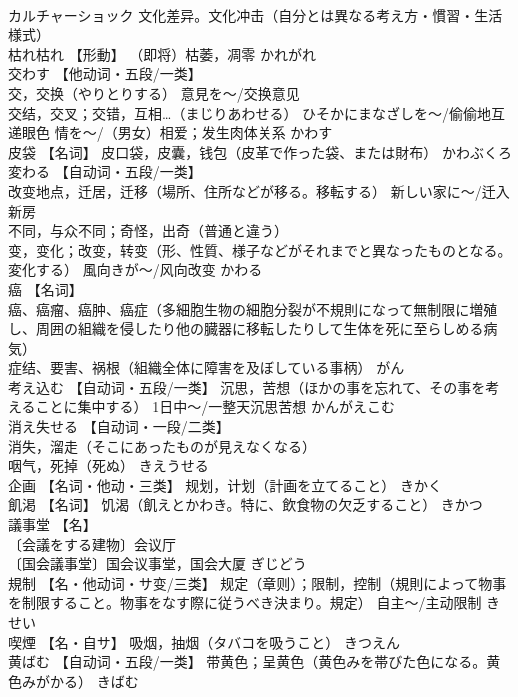 \documentclass[8pt]{extreport}
\begin{document}
\begin{CJK}{UTF8}{min}
\\	カルチャーショック	文化差异。文化冲击（自分とは異なる考え方・慣習・生活様式）		
\\	枯れ枯れ	【形動】 （即将）枯萎，凋零	かれがれ	
\\	交わす	【他动词・五段/一类】 
\\	交，交换（やりとりする） 意見を～/交换意见 
\\	交结，交叉；交错，互相…（まじりあわせる） ひそかにまなざしを～/偷偷地互递眼色 情を～/（男女）相爱；发生肉体关系	かわす	
\\	皮袋	【名词】 皮口袋，皮囊，钱包（皮革で作った袋、または財布）	かわぶくろ	
\\	変わる	【自动词・五段/一类】 
\\	改变地点，迁居，迁移（場所、住所などが移る。移転する） 新しい家に～/迁入新房 
\\	不同，与众不同；奇怪，出奇（普通と違う） 
\\	变，变化；改变，转变（形、性質、様子などがそれまでと異なったものとなる。変化する） 風向きが～/风向改变	かわる	
\\	癌	【名词】 
\\	癌、癌瘤、癌肿、癌症（多細胞生物の細胞分裂が不規則になって無制限に増殖し、周囲の組織を侵したり他の臓器に移転したりして生体を死に至らしめる病気） 
\\	症结、要害、祸根（組織全体に障害を及ぼしている事柄）	がん	
\\	考え込む	【自动词・五段/一类】 沉思，苦想（ほかの事を忘れて、その事を考えることに集中する） 1日中～/一整天沉思苦想	かんがえこむ	
\\	消え失せる	【自动词・一段/二类】 
\\	消失，溜走（そこにあったものが見えなくなる） 
\\	咽气，死掉（死ぬ）	きえうせる	
\\	企画	【名词・他动・三类】 规划，计划（計画を立てること）	きかく	
\\	飢渇	【名词】 饥渴（飢えとかわき。特に、飲食物の欠乏すること）	きかつ	
\\	議事堂	【名】 
\\	〔会議をする建物〕会议厅 
\\	〔国会議事堂〕国会议事堂，国会大厦	ぎじどう	
\\	規制	【名・他动词・サ变/三类】 规定（章则）；限制，控制（規則によって物事を制限すること。物事をなす際に従うべき決まり。規定） 自主～/主动限制	きせい	
\\	喫煙	【名・自サ】 吸烟，抽烟（タバコを吸うこと）	きつえん	
\\	黄ばむ	【自动词・五段/一类】 带黄色；呈黄色（黄色みを帯びた色になる。黄色みがかる）	きばむ	

\end{CJK}
\end{document}
